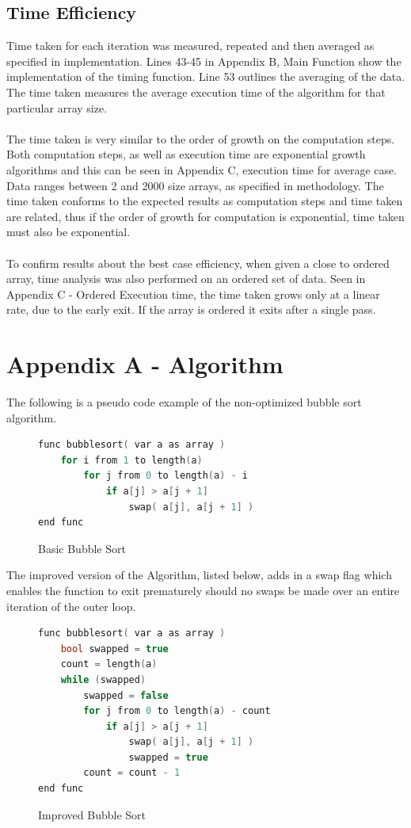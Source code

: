 \documentclass[]{article}
\begin{document}
\subsection{Time Efficiency}
Time taken for each iteration was measured, repeated and then averaged as specified in implementation. Lines 43-45 in Appendix B, Main Function show the implementation of the timing function. Line 53 outlines the averaging of the data. The time taken measures the average execution time of the algorithm for that particular array size.
\\\\
The time taken is very similar to the order of growth on the computation steps. Both computation steps, as well as execution time are exponential growth algorithms and this can be seen in Appendix C, execution time for average case. Data ranges between 2 and 2000 size arrays, as specified in methodology. The time taken conforms to the expected results as computation steps and time taken are related, thus if the order of growth for computation is exponential, time taken must also be exponential. 
\\\\
To confirm results about the best case efficiency, when given a close to ordered array, time analysis was also performed on an ordered set of data. Seen in Appendix C - Ordered Execution time, the time taken grows only at a linear rate, due to the early exit. If the array is ordered it exits after a single pass.


\section{Appendix A - Algorithm}
The following is a pseudo code example of the non-optimized bubble sort algorithm. 
\begin{figure}[H]
	\caption{Basic Bubble Sort}
	\label{BasicBubbleSort}
\begin{lstlisting}[language=c++]
func bubblesort( var a as array )
	for i from 1 to length(a)
		for j from 0 to length(a) - i
			if a[j] > a[j + 1]
				swap( a[j], a[j + 1] )
end func
\end{lstlisting}
\end{figure}
The improved version of the Algorithm, listed below, adds in a swap flag which enables the function to exit prematurely should no swaps be made over an entire iteration of the outer loop.

\begin{figure}[H]\label{BetterBubbleSort}
	\caption{Improved Bubble Sort}
\begin{lstlisting}[language=c++]
func bubblesort( var a as array )
	bool swapped = true
	count = length(a)
	while (swapped)
		swapped = false
		for j from 0 to length(a) - count
			if a[j] > a[j + 1]
				swap( a[j], a[j + 1] )
				swapped = true
		count = count - 1
end func
\end{lstlisting}
\end{figure}
\end{document}
